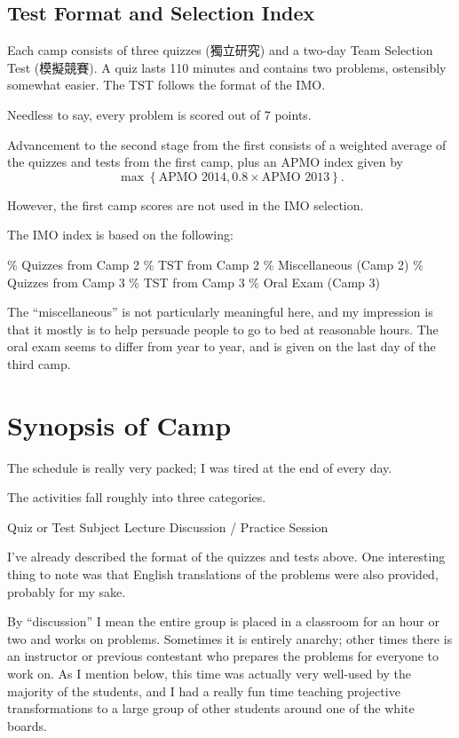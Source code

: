 \documentclass[11pt]{scrreprt}
\begin{document}
\subsection{Test Format and Selection Index}
Each camp consists of three quizzes (獨立研究) and a two-day Team Selection Test (模擬競賽).
A quiz lasts 110 minutes and contains two problems, ostensibly somewhat easier. The TST follows the format of the IMO.

Needless to say, every problem is scored out of 7 points.

Advancement to the second stage from the first consists of a weighted average of the quizzes and tests from the first camp, plus an APMO index given by
\[ \max \left\{ \text{APMO 2014}, 0.8 \times \text{APMO 2013} \right\}. \]

However, the first camp scores are not used in the IMO selection.

The IMO index is based on the following:
\begin{itemize}
  \% Quizzes from Camp 2
  \% TST from Camp 2
  \% Miscellaneous (Camp 2)
  \% Quizzes from Camp 3
  \% TST from Camp 3
  \% Oral Exam (Camp 3)
\end{itemize}
The ``miscellaneous'' is not particularly meaningful here, and my impression is that it mostly is to help persuade people to go to bed at reasonable hours.
The oral exam seems to differ from year to year, and is given on the last day of the third camp.


\section{Synopsis of Camp}
The schedule is really very packed; I was tired at the end of every day.

The activities fall roughly into three categories.
\begin{itemize}
  \ii Quiz or Test
  \ii Subject Lecture
  \ii Discussion / Practice Session
\end{itemize}

I've already described the format of the quizzes and tests above. One interesting thing to note was that English translations of the problems were also provided, probably for my sake.

By ``discussion'' I mean the entire group is placed in a classroom for an hour or two and works on problems. Sometimes it is entirely anarchy; other times there is an instructor or previous contestant who prepares the problems for everyone to work on. As I mention below, this time was actually very well-used by the majority of the students, and I had a really fun time teaching projective transformations to a large group of other students around one of the white boards.
\end{document}
